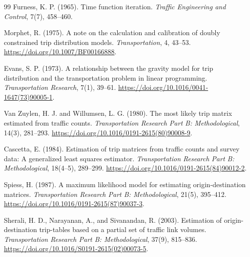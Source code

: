 \documentclass[11pt,a4paper]{article}
\begin{document}
\begin{thebibliography}{99}
Furness, K. P. (1965).
\newblock Time function iteration.
\newblock \emph{Traffic Engineering and Control}, 7(7), 458--460.

Morphet, R. (1975).
\newblock A note on the calculation and calibration of doubly constrained trip
distribution models.
\newblock \emph{Transportation}, 4, 43--53.
\newblock \url{https://doi.org/10.1007/BF00166888}.

Evans, S. P. (1973).
\newblock A relationship between the gravity model for trip distribution and
the transportation problem in linear programming.
\newblock \emph{Transportation Research}, 7(1), 39--61.
\newblock \url{https://doi.org/10.1016/0041-1647(73)90005-1}.

Van Zuylen, H. J. and Willumsen, L. G. (1980).
\newblock The most likely trip matrix estimated from traffic counts.
\newblock \emph{Transportation Research Part B: Methodological}, 14(3),
281--293.
\newblock \url{https://doi.org/10.1016/0191-2615(80)90008-9}.

Cascetta, E. (1984).
\newblock Estimation of trip matrices from traffic counts and survey data: A
generalized least squares estimator.
\newblock \emph{Transportation Research Part B: Methodological}, 18(4--5),
289--299.
\newblock \url{https://doi.org/10.1016/0191-2615(84)90012-2}.

Spiess, H. (1987).
\newblock A maximum likelihood model for estimating origin-destination
matrices.
\newblock \emph{Transportation Research Part B: Methodological}, 21(5),
395--412.
\newblock \url{https://doi.org/10.1016/0191-2615(87)90037-3}.

Sherali, H. D., Narayanan, A., and Sivanandan, R. (2003).
\newblock Estimation of origin-destination trip-tables based on a partial set
of traffic link volumes.
\newblock \emph{Transportation Research Part B: Methodological}, 37(9),
815--836.
\newblock \url{https://doi.org/10.1016/S0191-2615(02)00073-5}.

\end{thebibliography}
\end{document}

